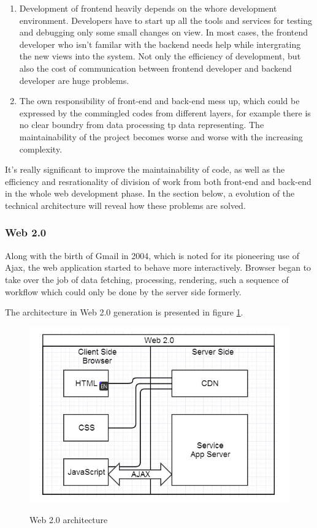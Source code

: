 \begin{enumerate}
\item
Development of frontend heavily depends on the whore development environment. Developers have to start up all the tools and services for testing and debugging only some small changes on view. In most cases, the frontend developer who isn't familar with the backend needs help while intergrating the new views into the system. Not only the efficiency of development, but also the cost of communication between frontend developer and backend developer are huge problems.
\item
The own responsibility of front-end and back-end mess up, which could be expressed by the commingled codes from different layers, for example there is no clear boundry from data processing tp data representing. The maintainability of the project becomes worse and worse with the increasing complexity.
\end{enumerate}

It's really significant to improve the maintainability of code, as well as the efficiency and resrationality of division of work from both front-end and back-end in the whole web development phase. In the section below, a evolution of the technical architecture will reveal how these problems are solved.

\subsubsection{Web 2.0}
Along with the birth of Gmail\footnotemark[1]  in 2004, which is noted for its pioneering use of \gls{Ajax}, the web application started to behave more interactively. Browser began to take over the job of data fetching, processing, rendering, such a sequence of workflow which could only be done by the server side formerly.

The architecture in Web 2.0 generation is presented in figure \ref{fig:3.2}.

\begin{figure}[!htbp]
  \caption{Web 2.0 architecture}
  \centering
    \includegraphics[width=1\textwidth]{Figures/3_2.png}
  \label{fig:3.2}
\end{figure}

